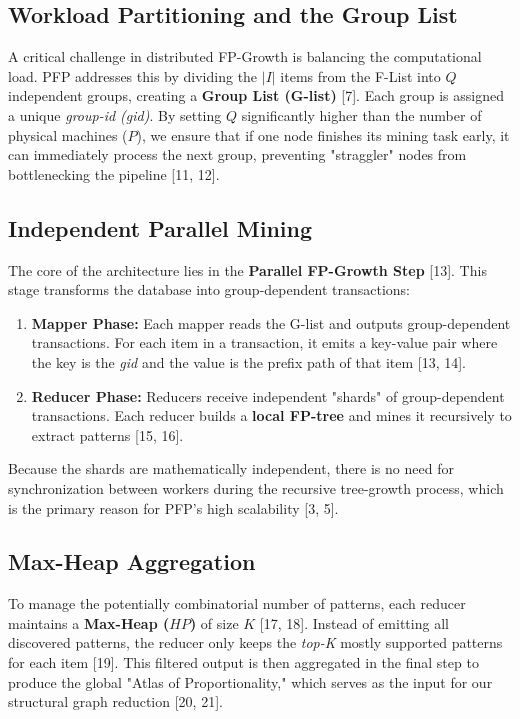 \documentclass[10pt, twocolumn]{article}
\begin{document}
\subsection{Workload Partitioning and the Group List}
A critical challenge in distributed FP-Growth is balancing the computational
load. PFP addresses this by dividing the $|I|$ items from the F-List into $Q$
independent groups, creating a \textbf{Group List (G-list)} [7].
Each group is assigned a unique \textit{group-id (gid)}. By setting $Q$
significantly higher than the number of physical machines ($P$), we ensure that
if one node finishes its mining task early, it can immediately process the next
group, preventing "straggler" nodes from bottlenecking the pipeline [11, 12].

\subsection{Independent Parallel Mining}
The core of the architecture lies in the \textbf{Parallel FP-Growth Step} [13].
This stage transforms the database into group-dependent transactions:
\begin{enumerate}
    \item \textbf{Mapper Phase:} Each mapper reads the G-list and outputs
          group-dependent transactions. For each item in a transaction, it emits a
          key-value pair where the key is the \textit{gid} and the value is the prefix
          path of that item [13, 14].
    \item \textbf{Reducer Phase:} Reducers receive independent "shards" of
          group-dependent transactions. Each reducer builds a \textbf{local FP-tree} and
          mines it recursively to extract patterns [15, 16].
\end{enumerate}
Because the shards are mathematically independent, there is no need for
synchronization between workers during the recursive tree-growth process, which
is the primary reason for PFP's high scalability [3, 5].

\subsection{Max-Heap Aggregation}
To manage the potentially combinatorial number of patterns, each reducer
maintains a \textbf{Max-Heap ($HP$)} of size $K$ [17, 18]. Instead of emitting
all discovered patterns, the reducer only keeps the \textit{top-K} mostly
supported patterns for each item [19]. This filtered output is then aggregated
in the final step to produce the global "Atlas of Proportionality," which
serves as the input for our structural graph reduction [20, 21].
\end{document}
